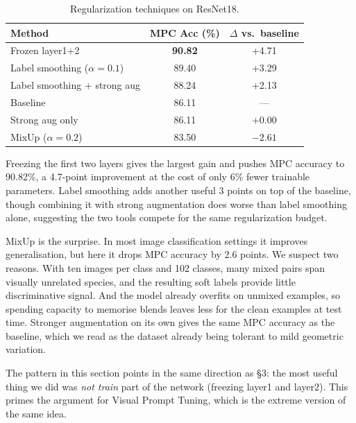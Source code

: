 \begin{table}[H]
\centering
\small
\begin{tabular}{lcc}
\toprule
Method & MPC Acc (\%) & $\Delta$ vs.\ baseline \\
\midrule
Frozen layer1+2       & \textbf{90.82} & +4.71 \\
Label smoothing ($\alpha{=}0.1$) & 89.40 & +3.29 \\
Label smoothing + strong aug & 88.24 & +2.13 \\
Baseline              & 86.11 & --- \\
Strong aug only       & 86.11 & +0.00 \\
MixUp ($\alpha{=}0.2$) & 83.50 & $-2.61$ \\
\bottomrule
\end{tabular}
\caption{Regularization techniques on ResNet18.}
\label{tab:reg-results}
\end{table}

Freezing the first two layers gives the largest gain and pushes MPC accuracy to 90.82\%, a 4.7-point improvement at the cost of only 6\% fewer trainable parameters. Label smoothing adds another useful 3 points on top of the baseline, though combining it with strong augmentation does worse than label smoothing alone, suggesting the two tools compete for the same regularization budget.

MixUp is the surprise. In most image classification settings it improves generalisation, but here it drops MPC accuracy by 2.6 points. We suspect two reasons. With ten images per class and 102 classes, many mixed pairs span visually unrelated species, and the resulting soft labels provide little discriminative signal. And the model already overfits on unmixed examples, so spending capacity to memorise blends leaves less for the clean examples at test time. Stronger augmentation on its own gives the same MPC accuracy as the baseline, which we read as the dataset already being tolerant to mild geometric variation.

The pattern in this section points in the same direction as \S3: the most useful thing we did was \emph{not train} part of the network (freezing layer1 and layer2). This primes the argument for Visual Prompt Tuning, which is the extreme version of the same idea.
